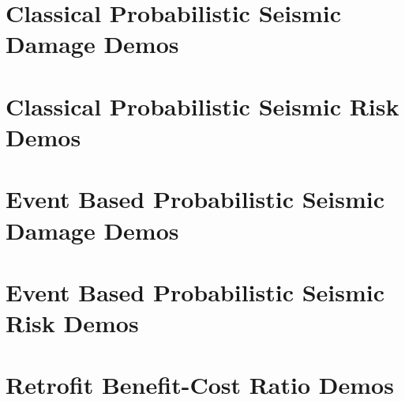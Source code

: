 \section{Classical Probabilistic Seismic Damage Demos}
\label{sec:demos_classical_damage}


\section{Classical Probabilistic Seismic Risk Demos}
\label{sec:demos_classical_risk}


\section{Event Based Probabilistic Seismic Damage Demos}
\label{sec:demos_event_based_damage}


\section{Event Based Probabilistic Seismic Risk Demos}
\label{sec:demos_event_based_risk}


\section{Retrofit Benefit-Cost Ratio Demos}
\label{sec:demos_benefit_cost}
